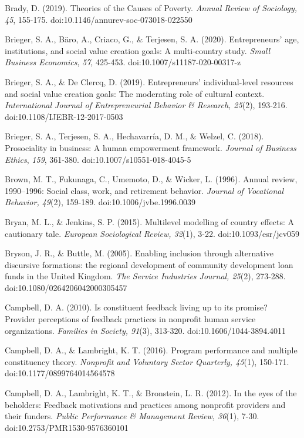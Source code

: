 \documentclass{article}
\begin{document}
Brady, D. (2019). Theories of the Causes of Poverty. \emph{Annual Review of Sociology, 45}, 155-175. doi:10.1146/annurev-soc-073018-022550

Brieger, S. A., Bäro, A., Criaco, G., \& Terjesen, S. A. (2020). Entrepreneurs' age, institutions, and social value creation goals: A multi-country study. \emph{Small Business Economics}, \emph{57}, 425-453. doi:10.1007/s11187-020-00317-z

Brieger, S. A., \& De Clercq, D. (2019). Entrepreneurs' individual-level resources and social value creation goals: The moderating role of cultural context. \emph{International Journal of Entrepreneurial }\emph{Behavior}\emph{ \& Research, 25}(2), 193-216. doi:10.1108/IJEBR-12-2017-0503

Brieger, S. A., Terjesen, S. A., Hechavarría, D. M., \& Welzel, C. (2018). Prosociality in business: A human empowerment framework. \emph{Journal of Business Ethics}, \emph{159}, 361-380. doi:10.1007/s10551-018-4045-5

Brown, M. T., Fukunaga, C., Umemoto, D., \& Wicker, L. (1996). Annual review, 1990--1996: Social class, work, and retirement behavior. \emph{Journal of Vocational }\emph{Behavior}\emph{, 49}(2), 159-189. doi:10.1006/jvbe.1996.0039

Bryan, M. L., \& Jenkins, S. P. (2015). Multilevel modelling of country effects: A cautionary tale. \emph{European Sociological Review, 32}(1), 3-22. doi:10.1093/esr/jcv059

Bryson, J. R., \& Buttle, M. (2005). Enabling inclusion through alternative discursive formations: the regional development of community development loan funds in the United Kingdom. \emph{The Service Industries Journal, 25}(2), 273-288. doi:10.1080/0264206042000305457

Campbell, D. A. (2010). Is constituent feedback living up to its promise? Provider perceptions of feedback practices in nonprofit human service organizations. \emph{Families in Society, 91}(3), 313-320. doi:10.1606/1044-3894.4011

Campbell, D. A., \& Lambright, K. T. (2016). Program performance and multiple constituency theory. \emph{Nonprofit}\emph{ and Voluntary Sector Quarterly, 45}(1), 150-171. doi:10.1177/0899764014564578

Campbell, D. A., Lambright, K. T., \& Bronstein, L. R. (2012). In the eyes of the beholders: Feedback motivations and practices among nonprofit providers and their funders. \emph{Public Performance \& Management Review, 36}(1), 7-30. doi:10.2753/PMR1530-9576360101
\end{document}
